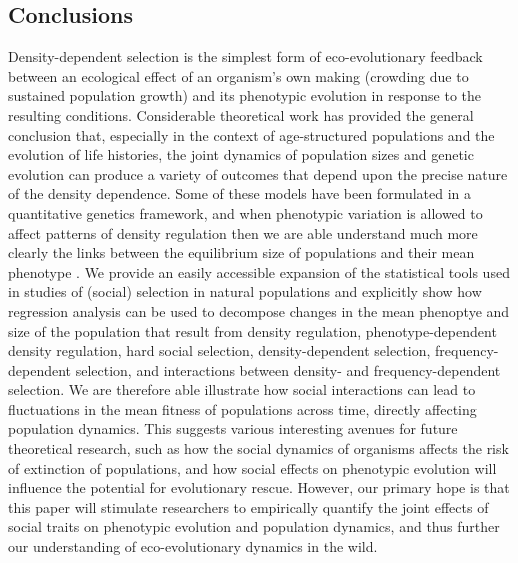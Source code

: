 \documentclass{article}
\begin{document}
\subsection{Conclusions}
Density-dependent selection is the simplest form of eco-evolutionary feedback between an ecological effect of an organism’s own making (crowding due to sustained population growth) and its phenotypic evolution in response to the resulting conditions. Considerable theoretical work has provided the general conclusion that, especially in the context of age-structured populations and the evolution of life histories, the joint dynamics of population sizes and genetic evolution can produce a variety of outcomes that depend upon the precise nature of the density dependence. Some of these models have been formulated in a quantitative genetics framework, and when phenotypic variation is allowed to affect patterns of density regulation then we are able understand much more clearly the links between the equilibrium size of populations and their mean phenotype \citep{Engen2020}. We provide an easily accessible expansion of the statistical tools used in studies of (social) selection in natural populations and explicitly show how regression analysis can be used to decompose changes in the mean phenoptye and size of the population that result from density regulation, phenotype-dependent density regulation, hard social selection, density-dependent selection, frequency-dependent selection, and interactions between density- and frequency-dependent selection. We are therefore able illustrate how social interactions can lead to fluctuations in the mean fitness of populations across time, directly affecting population dynamics. This suggests various interesting avenues for future theoretical research, such as how the social dynamics of organisms affects the risk of extinction of populations, and how social effects on phenotypic evolution will influence the potential for evolutionary rescue. However, our primary hope is that this paper will stimulate researchers to empirically quantify the joint effects of social traits on phenotypic evolution and population dynamics, and thus further our understanding of eco-evolutionary dynamics in the wild.



  
\end{document}
